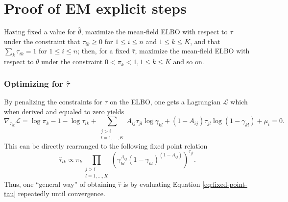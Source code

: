 \documentclass[../../main.tex]{subfiles} %
\begin{document}
	
\section{Proof of EM explicit steps} \label{proof:em-steps}

Having fixed a value for \(\hat \theta\), maximize the mean-field ELBO 
with respect to \(\tau\) under the constraint that \(\tau_{ik} \geq 0\) for \(1 
\leq i \leq n\) and \(1 \leq k \leq K\), and that \(\sum_k \tau_{ik} = 1\) for 
\(1 \leq i \leq n\); then, for a fixed \(\hat \tau\), maximize the mean-field 
ELBO with respect to \(\theta\) under the constraint \(0 < \pi_k < 1, 1 \leq k 
\leq K \) and so on. 

\subsubsection{Optimizing for \(\hat \tau \)} By penalizing the constraints for
\(\tau\) on the ELBO, one gets a Lagrangian \(\mathscr L\) which when derived 
and equaled to zero yields
\begin{dmath*}
	\nabla_{\tau_{ik}} \mathscr L = \log{\pi_k} - 1 - \log{\tau_{ik}} +
	\sum_{\substack{j > i \\ l = 1, \dots, K}} A_{ij} \tau_{jl}
	\log{\gamma_{kl}} + \left( 1 - A_{ij} \right) \tau_{jl} \log{\left( 1 -
		\gamma_{kl}
		\right)} + \mu_i = 0.
\end{dmath*}
This can be directly rearranged to the following fixed point relation
\begin{equation}
	\hat \tau_{ik} \propto \pi_k \prod_{\substack{j > i \\ l = 1, \dots, K}}
	\left( \gamma_{kl}^{A_{ij}} \left( 1 - \gamma_{kl} \right)^{\left( 1 -
		A_{ij}
		\right)} \right)^{\tau_{jl}}.
	\label{eq:fixed-point-tau-proof}
\end{equation}
Thus, one ``general way'' of obtaining \(\hat \tau\) is by evaluating Equation
\eqref{eq:fixed-point-tau} repeatedly until convergence.
\end{document}
